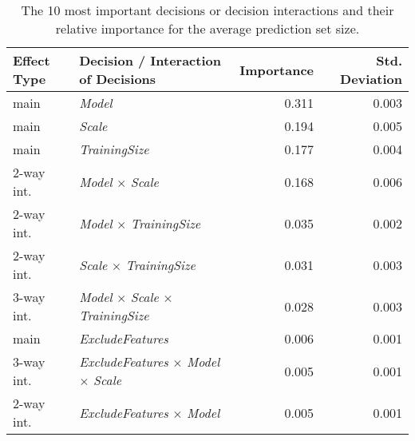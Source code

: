 \begin{table}
\centering
\caption{The 10 most important decisions or decision interactions and their relative importance for the average prediction set size.}
\label{tab:fanova_top10}
\begin{tabular}{llrr}
\toprule
Effect Type &                                      Decision / Interaction of Decisions &  Importance &  Std. Deviation \\
\midrule
       main &                                                           \textit{Model} &       0.311 &           0.003 \\
       main &                                                           \textit{Scale} &       0.194 &           0.005 \\
       main &                                                    \textit{TrainingSize} &       0.177 &           0.004 \\
 2-way int. &                                   \textit{Model} $\times$ \textit{Scale} &       0.168 &           0.006 \\
 2-way int. &                            \textit{Model} $\times$ \textit{TrainingSize} &       0.035 &           0.002 \\
 2-way int. &                            \textit{Scale} $\times$ \textit{TrainingSize} &       0.031 &           0.003 \\
 3-way int. &    \textit{Model} $\times$ \textit{Scale} $\times$ \textit{TrainingSize} &       0.028 &           0.003 \\
       main &                                                 \textit{ExcludeFeatures} &       0.006 &           0.001 \\
 3-way int. & \textit{ExcludeFeatures} $\times$ \textit{Model} $\times$ \textit{Scale} &       0.005 &           0.001 \\
 2-way int. &                         \textit{ExcludeFeatures} $\times$ \textit{Model} &       0.005 &           0.001 \\
\bottomrule
\end{tabular}
\end{table}
